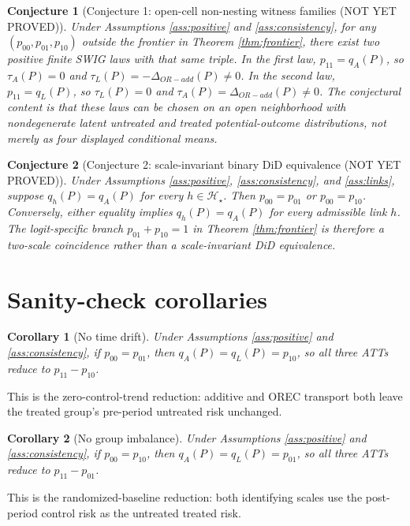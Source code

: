 \documentclass[11pt]{article}
\theoremstyle{definition}
\theoremstyle{plain}
\newtheorem{conjecture}{Conjecture}
\newtheorem{corollary}{Corollary}
\theoremstyle{remark}
\begin{document}
\begin{conjecture}[Conjecture 1: open-cell non-nesting witness families (NOT YET PROVED)]\label{conj:witness}
Under Assumptions \ref{ass:positive} and \ref{ass:consistency}, for any \((p_{00},p_{01},p_{10})\) outside the frontier in Theorem \ref{thm:frontier}, there exist two positive finite SWIG laws with that same triple.  In the first law, \(p_{11}=q_A(P)\), so \(\tau_A(P)=0\) and \(\tau_L(P)=-\Delta_{OR-add}(P)\neq0\).  In the second law, \(p_{11}=q_L(P)\), so \(\tau_L(P)=0\) and \(\tau_A(P)=\Delta_{OR-add}(P)\neq0\).  The conjectural content is that these laws can be chosen on an open neighborhood with nondegenerate latent untreated and treated potential-outcome distributions, not merely as four displayed conditional means.
\end{conjecture}

\begin{conjecture}[Conjecture 2: scale-invariant binary DiD equivalence (NOT YET PROVED)]\label{conj:scale}
Under Assumptions \ref{ass:positive}, \ref{ass:consistency}, and \ref{ass:links}, suppose \(q_h(P)=q_A(P)\) for every \(h\in\mathcal H_\star\).  Then \(p_{00}=p_{01}\) or \(p_{00}=p_{10}\).  Conversely, either equality implies \(q_h(P)=q_A(P)\) for every admissible link \(h\).  The logit-specific branch \(p_{01}+p_{10}=1\) in Theorem \ref{thm:frontier} is therefore a two-scale coincidence rather than a scale-invariant DiD equivalence.
\end{conjecture}

\section{Sanity-check corollaries}
\begin{corollary}[No time drift]
Under Assumptions \ref{ass:positive} and \ref{ass:consistency}, if \(p_{00}=p_{01}\), then \(q_A(P)=q_L(P)=p_{10}\), so all three ATTs reduce to \(p_{11}-p_{10}\).
\end{corollary}
This is the zero-control-trend reduction: additive and OREC transport both leave the treated group's pre-period untreated risk unchanged.

\begin{corollary}[No group imbalance]
Under Assumptions \ref{ass:positive} and \ref{ass:consistency}, if \(p_{00}=p_{10}\), then \(q_A(P)=q_L(P)=p_{01}\), so all three ATTs reduce to \(p_{11}-p_{01}\).
\end{corollary}
This is the randomized-baseline reduction: both identifying scales use the post-period control risk as the untreated treated risk.
\end{document}
